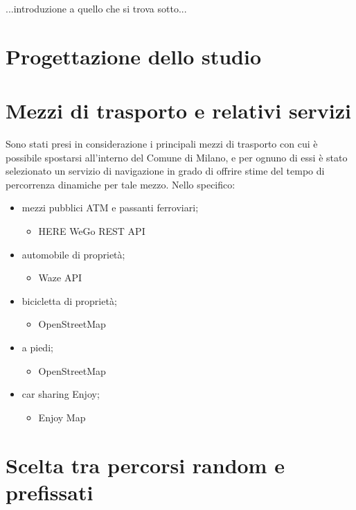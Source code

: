...introduzione a quello che si trova sotto...

\section{Progettazione dello studio}

\section{Mezzi di trasporto e relativi servizi}

Sono stati presi in considerazione i principali mezzi di trasporto con cui è possibile spostarsi all'interno del Comune di Milano, e per ognuno di essi è stato selezionato un servizio di navigazione in grado di offrire stime del tempo di percorrenza dinamiche per tale mezzo. Nello specifico:

\begin{itemize}
	\item mezzi pubblici ATM e passanti ferroviari;
	\begin{itemize}
		\item HERE WeGo REST API\cite{herewegoapi}
	\end{itemize}
	\item automobile di proprietà;
	\begin{itemize}
		\item Waze API\cite{wazeapi}
	\end{itemize}
	\item bicicletta di proprietà;
	\begin{itemize}
		\item OpenStreetMap\cite{openstreetmap}
	\end{itemize}
	\item a piedi;
	\begin{itemize}
		\item OpenStreetMap\cite{openstreetmap}
	\end{itemize}
	\item car sharing Enjoy;
	\begin{itemize}
		\item Enjoy Map\cite{enjoycarsharing}
	\end{itemize}
\end{itemize}

\section{Scelta tra percorsi random e prefissati}

